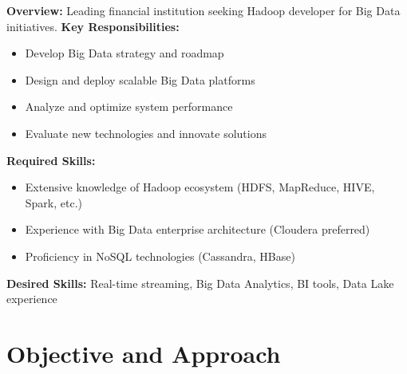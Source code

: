 \documentclass[12pt]{article}
\begin{document}
\begin{tcolorbox}[colback=gray!5,colframe=blue!75!black, title=Vacancy Posting Snippet - Hadoop Developer, label=box:vacancy_posting]
\small
\textbf{Overview:} Leading financial institution seeking Hadoop developer for Big Data initiatives.
\textbf{Key Responsibilities:}
\begin{itemize}
\item Develop Big Data strategy and roadmap
\item Design and deploy scalable Big Data platforms
\item Analyze and optimize system performance
\item Evaluate new technologies and innovate solutions
\end{itemize}
\textbf{Required Skills:}
\begin{itemize}
\item Extensive knowledge of Hadoop ecosystem (HDFS, MapReduce, HIVE, Spark, etc.)
\item Experience with Big Data enterprise architecture (Cloudera preferred)
\item Proficiency in NoSQL technologies (Cassandra, HBase)
\end{itemize}
\textbf{Desired Skills:} Real-time streaming, Big Data Analytics, BI tools, Data Lake experience
\end{tcolorbox} 




\section{Objective and Approach}\label{sec:objective_approach}
\end{document}
